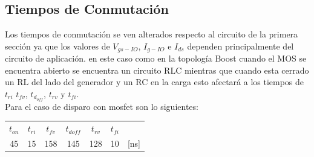 \subsection{Tiempos de Conmutación}
Los tiempos de conmutación se ven alterados respecto al circuito de la primera sección ya que los valores de $V_{gs-IO}$, $I_{g-IO}$ e $I_{ds}$ dependen principalmente del circuito de aplicación.
en este caso como en la topología Boost cuando el MOS se encuentra abierto se encuentra un circuito RLC mientras que cuando esta cerrado un RL del lado del generador y un RC en la carga esto afectará a los tiempos de $t_{ri}$ $t_{fv}$, $t_{d_{off}}$, $t_{rv}$ y  $t_{fi}$.\\
Para el caso de disparo con mosfet son lo siguientes:
\begin{table}[H]
\center
\begin{tabular}{cccccc|c}
$t_{on}$ & $t_{ri}$ & $t_{fv}$ & $t_{doff}$ & $t_{rv}$ & $t_{fi}$ &          \\ \cline{1-6}
45       & 15       & 158      & 145        & 128      & 10       & {[}ns{]}
\end{tabular}
\end{table}


